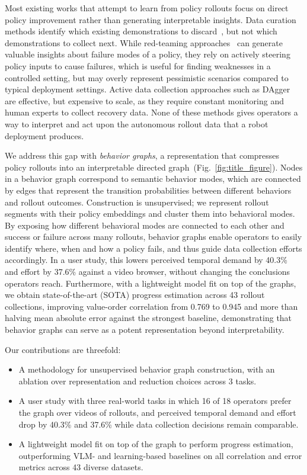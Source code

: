 \documentclass[letterpaper, 10 pt, conference]{ieeeconf}
\begin{document}
Most existing works that attempt to learn from policy rollouts focus on direct policy improvement rather than generating interpretable insights. Data curation methods identify which existing demonstrations to discard~\cite{agia_cupid_2025, zhang_scizor_2025, chen_sarm_2025, intelligence2025pi06vlalearnsexperience}, but not which demonstrations to collect next. While red-teaming approaches~\cite{karnik2024embodied, majumdar2025predictive} can generate valuable insights about failure modes of a policy, they rely on actively steering policy inputs to cause failures, which is useful for finding weaknesses in a controlled setting, but may overly represent pessimistic scenarios compared to typical deployment settings. Active data collection approaches such as DAgger~\cite{kelly2019hgdaggerinteractiveimitationlearning, ross_reduction_2011} are effective, but expensive to scale, as they require constant monitoring and human experts to collect recovery data. None of these methods gives operators a way to interpret and act upon the autonomous rollout data that a robot deployment produces.

We address this gap with \emph{behavior graphs}, a representation that compresses policy rollouts into an interpretable directed graph~(Fig.~\ref{fig:title_figure}). Nodes in a behavior graph correspond to semantic behavior modes, which are connected by edges that represent the transition probabilities between different behaviors and rollout outcomes. Construction is unsupervised; we represent rollout segments with their policy embeddings and cluster them into behavioral modes. By exposing how different behavioral modes are connected to each other and success or failure across many rollouts, behavior graphs enable operators to easily identify where, when and how a policy fails, and thus guide data collection efforts accordingly. In a user study, this lowers perceived temporal demand by 40.3\% and effort by 37.6\% against a video browser, without changing the conclusions operators reach. Furthermore, with a lightweight model fit on top of the graphs, we obtain state-of-the-art (SOTA) progress estimation across 43 rollout collections, improving value-order correlation from 0.769 to 0.945 and more than halving mean absolute error against the strongest baseline, demonstrating that behavior graphs can serve as a potent representation beyond interpretability.

Our contributions are threefold:
\begin{itemize}
    \item A methodology for unsupervised behavior graph construction, with an ablation over representation and reduction choices across 3 tasks.
    \item A user study with three real-world tasks in which 16 of 18 operators prefer the graph over videos of rollouts, and perceived temporal demand and effort drop by 40.3\% and 37.6\% while data collection decisions remain comparable.
    \item A lightweight model fit on top of the graph to perform progress estimation, outperforming VLM- and learning-based baselines on all correlation and error metrics across 43 diverse datasets.
\end{itemize}
\end{document}
